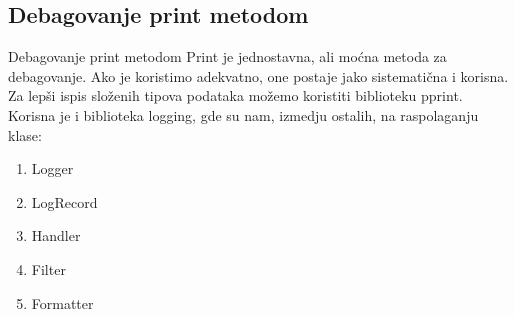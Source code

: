 \documentclass{beamer}
\begin{document}
\subsection{Debagovanje print metodom}
\begin{frame}{Debagovanje print metodom}
Print je jednostavna, ali moćna metoda za debagovanje. Ako je koristimo adekvatno, one postaje jako sistematična i korisna. Za lepši ispis složenih tipova podataka možemo koristiti biblioteku pprint. \\
Korisna je i biblioteka logging, gde su nam, izmedju ostalih, na raspolaganju klase:
\begin{enumerate}
    \item Logger
    \item LogRecord
    \item Handler
    \item Filter
    \item Formatter
\end{enumerate}  
\end{frame}

\end{document}
